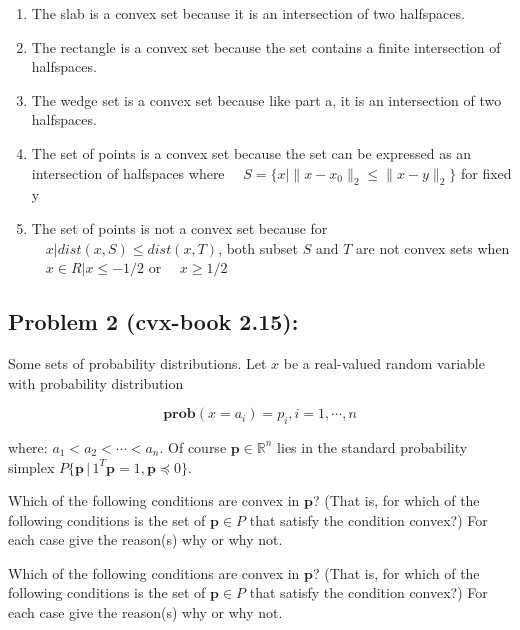 \documentclass[
  letterpaper,
  DIV=11,
  numbers=noendperiod]{scrartcl}
\providecommand{\tightlist}{%
  \setlength{\itemsep}{0pt}\setlength{\parskip}{0pt}}\usepackage{longtable,booktabs,array}
\begin{document}
\begin{enumerate}
\def\labelenumi{\alph{enumi}.}
\tightlist
\item
  The slab is a convex set because it is an intersection of two
  halfspaces.
\item
  The rectangle is a convex set because the set contains a finite
  intersection of halfspaces.
\item
  The wedge set is a convex set because like part a, it is an
  intersection of two halfspaces.
\item
  The set of points is a convex set because the set can be expressed as
  an intersection of halfspaces where
  \(\quad S = \{ x \mid \| x - x_0 \|_2 \leq \| x - y \|_2 \}\) for
  fixed y
\item
  The set of points is not a convex set because for
  \(\quad {x | dist(x, S) ≤ dist(x, T)}\), both subset \(S\) and \(T\)
  are not convex sets when \(\quad{x ∈ R | x ≤ −1/2}\) or
  \(\quad {x ≥ 1/2}\)
\end{enumerate}

\subsection{Problem 2 (cvx-book 2.15):}\label{problem-2-cvx-book-2.15}

Some sets of probability distributions. Let \(x\) be a real-valued
random variable with probability distribution

\[\mathbf{prob}(x = a_i) = p_i, i = 1, \cdots, n\]

where: \(a_1 < a_2 < \cdots < a_n\). Of course
\(\mathbf{p} \in \mathbb{R}^n\) lies in the standard probability simplex
\(P \{\mathbf{p}\, |\, 1^T \mathbf{p} = 1, \mathbf{p} \preceq 0\}\).

Which of the following conditions are convex in \(\mathbf{p}\)? (That
is, for which of the following conditions is the set of
\(\mathbf{p} \in P\) that satisfy the condition convex?) For each case
give the reason(s) why or why not.

Which of the following conditions are convex in \(\mathbf{p}\)? (That
is, for which of the following conditions is the set of
\(\mathbf{p} \in P\) that satisfy the condition convex?) For each case
give the reason(s) why or why not.
\end{document}
